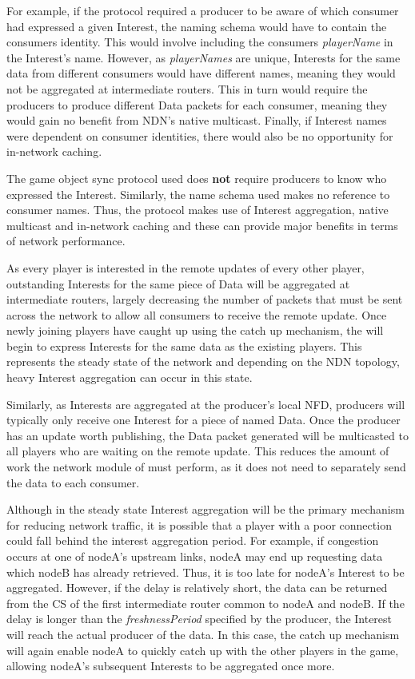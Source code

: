 For example, if the protocol required a producer to be aware of which consumer had expressed a given Interest, the naming schema would have to contain the consumers identity. This would involve including the consumers \textit{playerName} in the Interest's name. However, as \textit{playerNames} are unique, Interests for the same data from different consumers would have different names, meaning they would not be aggregated at intermediate routers. This in turn would require the producers to produce different Data packets for each consumer, meaning they would gain no benefit from NDN's native multicast. Finally, if Interest names were dependent on consumer identities, there would also be no opportunity for in-network caching.

The game object sync protocol used does \textbf{not} require producers to know who expressed the Interest. Similarly, the name schema used makes no reference to consumer names. Thus, the protocol makes use of Interest aggregation, native multicast and in-network caching and these can provide major benefits in terms of network performance.

As every player is interested in the remote updates of every other player, outstanding Interests for the same piece of Data will be aggregated at intermediate routers, largely decreasing the number of packets that must be sent across the network to allow all consumers to receive the remote update. Once newly joining players have caught up using the catch up mechanism, the will begin to express Interests for the same data as the existing players. This represents the steady state of the network and depending on the NDN topology, heavy Interest aggregation can occur in this state.

Similarly, as Interests are aggregated at the producer's local NFD, producers will typically only receive one Interest for a piece of named Data. Once the producer has an update worth publishing, the Data packet generated will be multicasted to all players who are waiting on the remote update. This reduces the amount of work the network module of \game{} must perform, as it does not need to separately send the data to each consumer.

Although in the steady state Interest aggregation will be the primary mechanism for reducing network traffic, it is possible that a player with a poor connection could fall behind the interest aggregation period. For example, if congestion occurs at one of nodeA's upstream links, nodeA may end up requesting data which nodeB has already retrieved. Thus, it is too late for nodeA's Interest to be aggregated. However, if the delay is relatively short, the data can be returned from the CS of the first intermediate router common to nodeA and nodeB. If the delay is longer than the \textit{freshnessPeriod} specified by the producer, the Interest will reach the actual producer of the data. In this case, the catch up mechanism will again enable nodeA to quickly catch up with the other players in the game, allowing nodeA's subsequent Interests to be aggregated once more.




